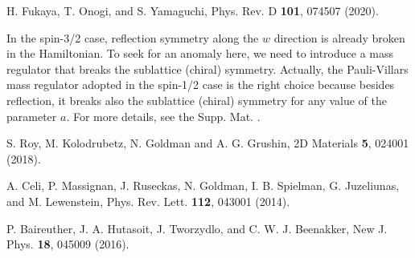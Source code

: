 \documentclass[twocolumn,prl,10pt,superscriptaddress]{revtex4}
\begin{document}
\begin{thebibliography}{99}
H. Fukaya, T. Onogi, and S. Yamaguchi, Phys. Rev. D {\bf 101}, 074507 (2020).

In the spin-3/2 case, reflection symmetry along the $w$ direction is already broken in the Hamiltonian.
To seek for an anomaly here, we need to introduce a mass regulator that breaks the sublattice (chiral) symmetry. Actually, the Pauli-Villars mass regulator adopted in the spin-1/2 case is the right choice because besides reflection, it breaks also the sublattice (chiral) symmetry for any value of the parameter $a$. For more details, see the Supp. Mat. \cite{SM}.

S. Roy, M. Kolodrubetz, N. Goldman and A. G. Grushin, 2D Materials {\bf 5}, 024001 (2018).



A. Celi, P. Massignan, J. Ruseckas, N. Goldman, I. B. Spielman, G. Juzeliunas, and M. Lewenstein,
Phys. Rev. Lett. \textbf{112}, 043001 (2014).

P. Baireuther, J. A. Hutasoit, J. Tworzydlo, and C. W. J.
Beenakker, New J. Phys. \textbf{18}, 045009
(2016).


















\end{thebibliography}
\end{document}
